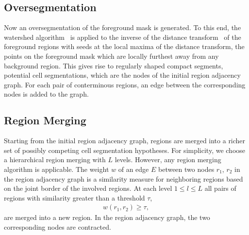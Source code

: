 \subsection{Oversegmentation}
\label{subsec:joint-oversegmentation}
Now an oversegmentation of the foreground mask is generated. To this end, the watershed
algorithm~\citep{vincent_91_watersheds,roerdink_00_watershed} is applied to the inverse of
the distance transform~\citep[Section~18.4.4]{jaehne_05_digital} of the foreground regions with seeds
at the local maxima of the distance transform, \ie the points on the foreground mask which are
locally furthest away from any background region. This gives rise to regularly shaped compact
segments, potential cell segmentations, which are the nodes of the initial region adjacency
graph. For each pair of conterminous regions, an edge between the corresponding nodes is added to
the graph.

\subsection{Region Merging}
\label{subsec:joint-region-merging}
Starting from the initial region adjacency graph, regions are merged into a richer set of possibly
competing cell segmentation hypotheses. For simplicity, we choose a hierarchical region merging with
$L$ levels. However, any region merging algorithm is applicable. The weight $w$ of an edge $E$
between two nodes $r_1$, $r_2$ in the region adjacency graph is a similarity measure for neighboring
regions based on the joint border of the involved regions. At each level $1 \le l \le L$ all pairs of
regions with similarity greater than a threshold $\tau$,
\begin{align}
    w(r_1, r_2) \ge \tau,
\end{align}
are merged into a new region. In the region adjacency graph, the two corresponding nodes are
contracted.

%         
%         

